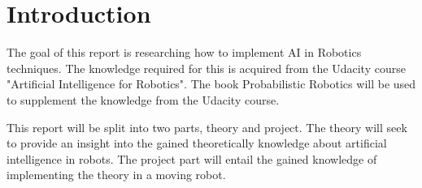 \chapter{Introduction}
The goal of this report is researching how to implement AI in Robotics techniques. The knowledge required for this is acquired from the Udacity course "Artificial Intelligence for Robotics"\cite{AIROK}. The book Probabilistic Robotics\cite{thrun2005probabilistic} will be used to supplement the knowledge from the Udacity course.

This report will be split into two parts, theory and project. The theory will seek to provide an insight into the gained theoretically knowledge about artificial intelligence in robots.
The project part will entail the gained knowledge of implementing the theory in a moving robot.
